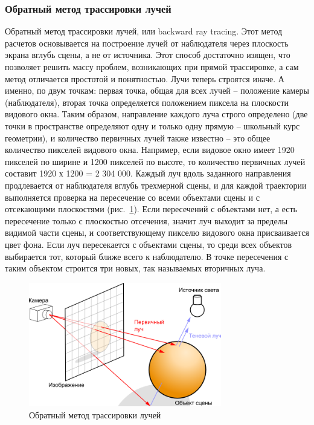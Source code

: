 \documentclass[12pt, a4paper, utf8]{article}
\begin{document}
\subsubsection{Обратный метод трассировки лучей}
Обратный метод трассировки лучей, или backward ray tracing. Этот метод расчетов основывается на построение лучей от наблюдателя через плоскость экрана вглубь сцены, а не от источника. Этот способ достаточно изящен, что позволяет решить массу проблем, возникающих при прямой трассировке, а сам метод отличается простотой и понятностью. Лучи теперь строятся иначе. А именно, по двум точкам: первая точка, общая для всех лучей – положение камеры (наблюдателя), вторая точка определяется положением пиксела на плоскости видового окна. Таким образом, направление каждого луча строго определено (две точки в пространстве определяют одну и только одну прямую – школьный курс геометрии), и количество первичных лучей также известно – это общее количество пикселей видового окна. Например, если видовое окно имеет 1920 пикселей по ширине и 1200 пикселей по высоте, то количество первичных лучей составит 1920 х 1200 = 2 304 000. Каждый луч вдоль заданного направления продлевается от наблюдателя вглубь трехмерной сцены, и для каждой траектории выполняется проверка на пересечение со всеми объектами сцены и с отсекающими плоскостями (рис.~\ref{fig:alg_ray_tracing}). Если пересечений с объектами нет, а есть пересечение только с плоскостью отсечения, значит луч выходит за пределы видимой части сцены, и соответствующему пикселю видового окна присваивается цвет фона. Если луч пересекается с объектами сцены, то среди всех объектов выбирается тот, который ближе всего к наблюдателю. В точке пересечения с таким объектом строится три новых, так называемых вторичных луча.

\begin{figure}[h]
\centering
\includegraphics[width=0.75\textwidth]{imgs/Ray_trace_diagram_rus.png} 
\caption{Обратный метод трассировки лучей}\label{fig:alg_ray_tracing}
\end{figure}
\end{document}
